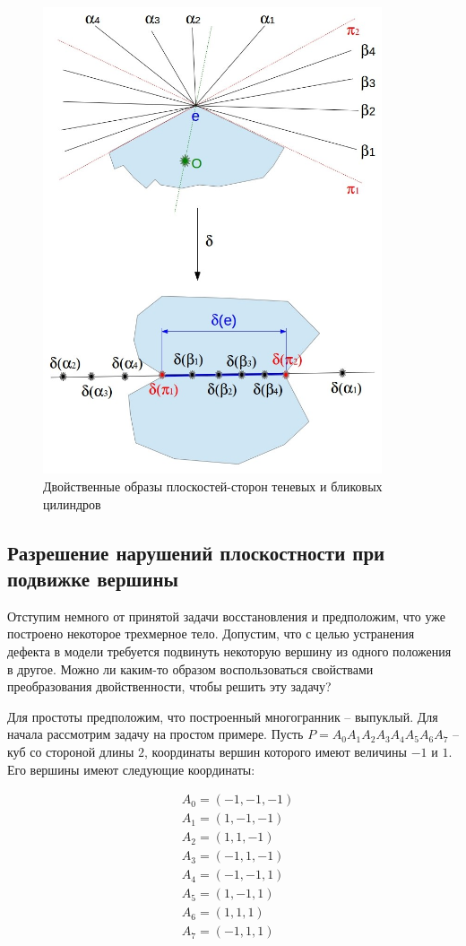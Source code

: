 \documentclass[a4paper, 12pt, titlepage]{article}
\theoremstyle{definition}
\theoremstyle{plain}
\theoremstyle{plain}
\begin{document}
\begin{figure}[ht]
 \includegraphics[width=10cm]{images/DualShadowBlinkSides.jpg}
 \caption{Двойственные образы плоскостей-сторон теневых и бликовых цилиндров}
 \label{DualShadowBlinkSides}
\end{figure}

\subsection{Разрешение нарушений плоскостности при подвижке вершины}

Отступим немного от принятой задачи восстановления и предположим, что уже
построено некоторое трехмерное тело. Допустим, что с целью устранения дефекта в
модели требуется подвинуть некоторую вершину из одного положения в другое.
Можно ли каким-то образом воспользоваться свойствами преобразования
двойственности, чтобы решить эту задачу?

Для простоты предположим, что построенный многогранник -- выпуклый. Для начала
рассмотрим задачу на простом примере. Пусть
$P = A_{0} A_{1} A_{2} A_{3} A_{4} A_{5} A_{6} A_{7}$ -- куб со
стороной длины $2$, координаты вершин которого имеют величины $-1$ и $1$. Его
вершины имеют следующие координаты:

\begin{align*}
 & A_{0} = (-1, -1, -1) \\ & A_{1} = (1, -1, -1) \\
 & A_{2} = (1, 1, -1)   \\ & A_{3} = (-1, 1, -1) \\
 & A_{4} = (-1, -1, 1)  \\ & A_{5} = (1, -1, 1)  \\
 & A_{6} = (1, 1, 1)    \\ & A_{7} = (-1, 1, 1)
\end{align*}
\end{document}
